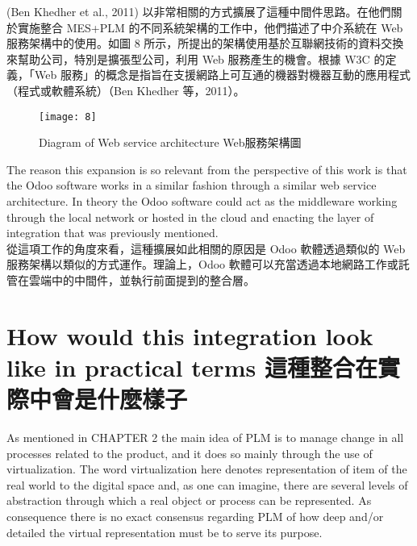 \fontsize{14pt}{5pt}\sectionef
 {(Ben Khedher et al., 2011) 以非常相關的方式擴展了這種中間件思路。在他們關於實施整合 MES+PLM 的不同系統架構的工作中，他們描述了中介系統在 Web 服務架構中的使用。如圖 8 所示，所提出的架構使用基於互聯網技術的資料交換來幫助公司，特別是擴張型公司，利用 Web 服務產生的機會。根據 W3C 的定義，「Web 服務」的概念是指旨在支援網路上可互通的機器對機器互動的應用程式（程式或軟體系統）（Ben Khedher 等，2011）。}\\[15pt]
\newpage

\begin{figure}[hbt!]
\begin{center}
\texttt{[image: 8]}
\caption{\Large Diagram of Web service architecture Web服務架構圖}\label{fig.8}
\end{center}
\end{figure}

\fontsize{14pt}{2.5pt}\sectionef 
{The reason this expansion is so relevant from the perspective of this work is that the Odoo software works in a similar fashion through a similar web service architecture. In theory the Odoo software could act as the middleware working through the local network or hosted in the cloud and enacting the layer of integration that was previously mentioned.}\\[10pt]

\fontsize{14pt}{5pt}\sectionef
 {從這項工作的角度來看，這種擴展如此相關的原因是 Odoo 軟體透過類似的 Web 服務架構以類似的方式運作。理論上，Odoo 軟體可以充當透過本地網路工作或託管在雲端中的中間件，並執行前面提到的整合層。}\\[15pt]

\section{How would this integration look like in practical terms 這種整合在實際中會是什麼樣子}

\fontsize{14pt}{2.5pt}\sectionef 
{As mentioned in CHAPTER 2 the main idea of PLM is to manage change in all processes related to the product, and it does so mainly through the use of virtualization. The word virtualization here denotes representation of item of the real world to the digital space and, as one can imagine, there are several levels of abstraction through which a real object or process can be represented. As consequence there is no exact consensus regarding PLM of how deep and/or detailed the virtual representation must be to serve its purpose.}\\[10pt]

